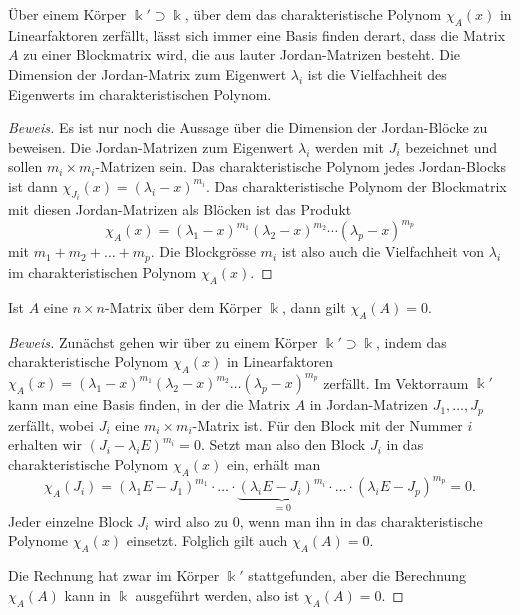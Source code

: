 \begin{satz}
\label{buch:eigenwerte:satz:jordannormalform}
Über einem Körper $\Bbbk'\supset\Bbbk$, über dem das charakteristische
Polynom $\chi_A(x)$ in Linearfaktoren zerfällt, lässt sich immer
eine Basis finden derart, dass die Matrix $A$ zu einer Blockmatrix wird,
die aus lauter Jordan-Matrizen besteht.
Die Dimension der Jordan-Matrix zum Eigenwert $\lambda_i$ ist die
Vielfachheit des Eigenwerts im charakteristischen Polynom.
\end{satz}

\begin{proof}[Beweis]
Es ist nur noch die Aussage über die Dimension der Jordan-Blöcke zu
beweisen.
Die Jordan-Matrizen zum Eigenwert $\lambda_i$ werden mit $J_i$
bezeichnet und sollen $m_i\times m_i$-Matrizen sein.
Das charakteristische Polynom jedes Jordan-Blocks ist dann
$\chi_{J_i}(x)=(\lambda_i-x)^{m_i}$.
Das charakteristische Polynom der Blockmatrix mit diesen Jordan-Matrizen
als Blöcken ist das Produkt
\[
\chi_A(x)
=
(\lambda_1-x)^{m_1}
(\lambda_2-x)^{m_2}
\cdots
(\lambda_p-x)^{m_p}
\]
mit $m_1+m_2+\dots+m_p$.
Die Blockgrösse $m_i$ ist also auch die Vielfachheit von $\lambda_i$ im
charakteristischen Polynom $\chi_A(x)$.
\end{proof}



\begin{satz}
\label{buch:normalformen:satz:cayley-hamilton}
Ist $A$ eine $n\times n$-Matrix über dem Körper $\Bbbk$, dann gilt
$\chi_A(A)=0$.
\end{satz}

\begin{proof}[Beweis]
Zunächst gehen wir über zu einem Körper $\Bbbk'\supset\Bbbk$, indem
das charakteristische Polynom $\chi_A(x)$ in Linearfaktoren
$\chi_A(x)
=
(\lambda_1-x)^{m_1}
(\lambda_2-x)^{m_2}
\dots
(\lambda_p-x)^{m_p}$
zerfällt.
Im Vektorraum $\Bbbk'$ kann man eine Basis finden, in der die Matrix
$A$ in Jordan-Matrizen $J_1,\dots,J_p$ zerfällt, wobei $J_i$ eine
$m_i\times m_i$-Matrix ist.
Für den Block mit der Nummer $i$ erhalten wir
$(J_i - \lambda_i E)^{m_i} = 0$.
Setzt man also den Block $J_i$ in das charakteristische Polynom
$\chi_A(x)$ ein, erhält man
\[
\chi_A(J_i)
=
(\lambda_1E - J_1)^{m_1}
\cdot
\ldots
\cdot
\underbrace{
(\lambda_iE - J_i)^{m_i}
}_{\displaystyle=0}
\cdot
\ldots
\cdot
(\lambda_iE - J_p)^{m_p}
=
0.
\]
Jeder einzelne Block $J_i$ wird also zu $0$, wenn man ihn in das
charakteristische Polynome $\chi_A(x)$ einsetzt.
Folglich gilt auch $\chi_A(A)=0$.

Die Rechnung hat zwar im Körper $\Bbbk'$ stattgefunden, aber die Berechnung
$\chi_A(A)$ kann in $\Bbbk$ ausgeführt werden, also ist $\chi_A(A)=0$.
\end{proof}

